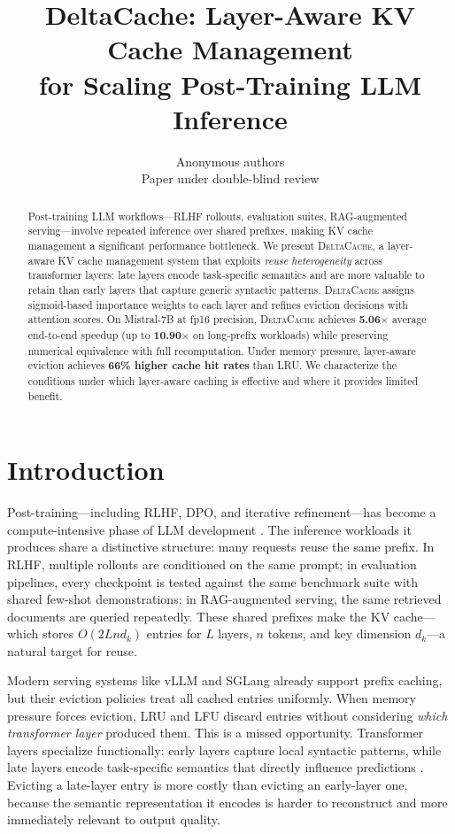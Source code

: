 \documentclass{article}
\title{DeltaCache: Layer-Aware KV Cache Management\\for Scaling Post-Training LLM Inference}
\author{Anonymous authors\\Paper under double-blind review}
\newcommand{\deltacache}{\textsc{DeltaCache}}
\begin{document}
\maketitle

\begin{abstract}
Post-training LLM workflows---RLHF rollouts, evaluation suites, RAG-augmented serving---involve repeated inference over shared prefixes, making KV cache management a significant performance bottleneck. We present \deltacache{}, a layer-aware KV cache management system that exploits \emph{reuse heterogeneity} across transformer layers: late layers encode task-specific semantics and are more valuable to retain than early layers that capture generic syntactic patterns. \deltacache{} assigns sigmoid-based importance weights to each layer and refines eviction decisions with attention scores. On Mistral-7B at fp16 precision, \deltacache{} achieves \textbf{5.06$\times$} average end-to-end speedup (up to \textbf{10.90$\times$} on long-prefix workloads) while preserving numerical equivalence with full recomputation. Under memory pressure, layer-aware eviction achieves \textbf{66\% higher cache hit rates} than LRU. We characterize the conditions under which layer-aware caching is effective and where it provides limited benefit.
\end{abstract}

\section{Introduction}

Post-training---including RLHF, DPO, and iterative refinement---has become a compute-intensive phase of LLM development \citep{openai2023gpt4,touvron2023llama}. The inference workloads it produces share a distinctive structure: many requests reuse the same prefix. In RLHF, multiple rollouts are conditioned on the same prompt; in evaluation pipelines, every checkpoint is tested against the same benchmark suite with shared few-shot demonstrations; in RAG-augmented serving, the same retrieved documents are queried repeatedly. These shared prefixes make the KV cache---which stores $O(2Lnd_k)$ entries for $L$ layers, $n$ tokens, and key dimension $d_k$---a natural target for reuse.

Modern serving systems like vLLM \citep{kwon2023efficient} and SGLang \citep{zheng2023efficiently} already support prefix caching, but their eviction policies treat all cached entries uniformly. When memory pressure forces eviction, LRU and LFU discard entries without considering \emph{which transformer layer} produced them. This is a missed opportunity. Transformer layers specialize functionally: early layers capture local syntactic patterns, while late layers encode task-specific semantics that directly influence predictions \citep{rogers2020primer,elhage2021mathematical,geva2023dissecting}. Evicting a late-layer entry is more costly than evicting an early-layer one, because the semantic representation it encodes is harder to reconstruct and more immediately relevant to output quality.
\end{document}
